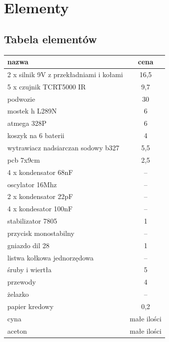 \documentclass[a4paper,11pt]{article}
\begin{document}
\section{Elementy}
\subsection{Tabela elementów}

\begin{center}

	\begin{tabular}{|l | c|}

		\hline
		nazwa 										& cena			\\ \hline
		2 x silnik 9V z przekładniami i kołami 		& 16,5			\\
		5 x czujnik	TCRT5000 IR						& 9,7			\\
		podwozie										& 30				\\
		mostek h L289N								& 6				\\
		atmega 328P									& 6				\\
		koszyk na 6 baterii							& 4				\\
		wytrawiacz nadsiarczan sodowy b327			& 5,5			\\
		pcb	7x9cm									& 2,5			\\
		4 x kondensator 68nF							& --				\\
		oscylator 16Mhz								& --				\\
		2 x kondensator 22pF							& --				\\
		4 x kondesator 100nF							& --				\\
		stabilizator 7805							& 1				\\
		przycisk monostabilny						& --				\\
		gniazdo dil 28								& 1				\\
		listwa kołkowa jednorzędowa					& --				\\
		śruby i wiertła								& 5				\\
		przewody										& 4				\\
		żelazko										& --				\\
		papier kredowy								& 0,2			\\
		cyna											& małe ilości	\\
		aceton										& małe ilości	\\
		\hline
	\end{tabular}

\end{center}
\end{document}

